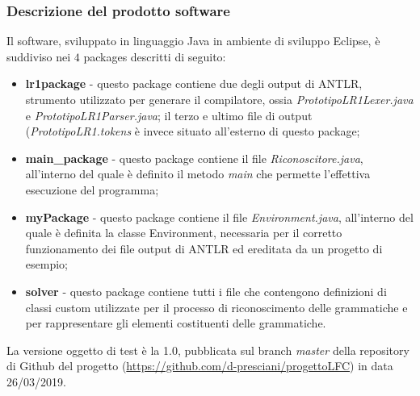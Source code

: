 \documentclass[12pt]{article}
\begin{document}
\subsubsection{Descrizione del prodotto software}
Il software, sviluppato in linguaggio Java in ambiente di sviluppo Eclipse, è suddiviso nei $4$ packages descritti di seguito:
\begin{itemize}
\item \textbf{lr1package} - questo package contiene due degli output di ANTLR, strumento utilizzato per generare il compilatore, ossia \textit{PrototipoLR1Lexer.java} e \textit{PrototipoLR1Parser.java}; il terzo e ultimo file di output (\textit{PrototipoLR1.tokens} è invece situato all'esterno di questo package;
\item \textbf{main\_package} - questo package contiene il file \textit{Riconoscitore.java}, all'interno del quale è definito il metodo \textit{main} che permette l'effettiva esecuzione del programma;
\item \textbf{myPackage} - questo package contiene il file \textit{Environment.java}, all'interno del quale è definita la classe Environment, necessaria per il corretto funzionamento dei file output di ANTLR ed ereditata da un progetto di esempio;
\item \textbf{solver} - questo package contiene tutti i file che contengono definizioni di classi custom utilizzate per il processo di riconoscimento delle grammatiche e per rappresentare gli elementi costituenti delle grammatiche.
\end{itemize}
La versione oggetto di test è la 1.0, pubblicata sul branch \textit{master} della repository di Github del progetto (\url{https://github.com/d-presciani/progettoLFC}) in data 26/03/2019.
\pagebreak
\end{document}
